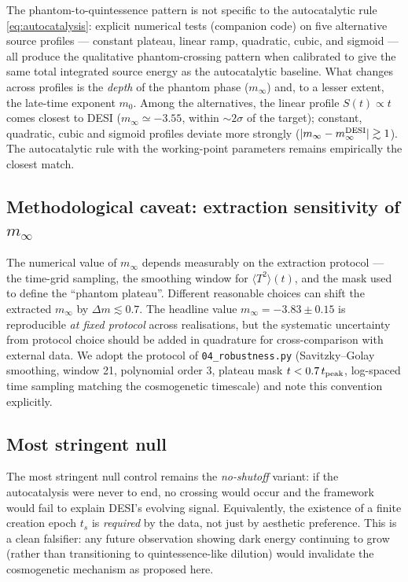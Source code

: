 \documentclass[11pt,a4paper]{article}
\begin{document}
The phantom-to-quintessence pattern is not specific to the
autocatalytic rule \eqref{eq:autocatalysis}: explicit numerical tests
(companion code) on five alternative source profiles --- constant
plateau, linear ramp, quadratic, cubic, and sigmoid --- all produce
the qualitative phantom-crossing pattern when calibrated to give the
same total integrated source energy as the autocatalytic baseline.
What changes across profiles is the \emph{depth} of the phantom phase
($m_\infty$) and, to a lesser extent, the late-time exponent $m_0$.
Among the alternatives, the linear profile $S(t) \propto t$ comes
closest to DESI ($m_\infty \simeq -3.55$, within $\sim 2\sigma$ of
the target); constant, quadratic, cubic and sigmoid profiles deviate
more strongly ($|m_\infty - m_\infty^{\rm DESI}| \gtrsim 1$). The
autocatalytic rule with the working-point parameters remains
empirically the closest match.

\subsection{Methodological caveat: extraction sensitivity of $m_\infty$}
\label{sec:extraction-sensitivity}

The numerical value of $m_\infty$ depends measurably on the
extraction protocol --- the time-grid sampling, the smoothing window
for $\langle T^2 \rangle(t)$, and the mask used to define the
``phantom plateau''. Different reasonable choices can shift the
extracted $m_\infty$ by $\Delta m \lesssim 0.7$. The headline value
$m_\infty = -3.83 \pm 0.15$ is reproducible \emph{at fixed protocol}
across realisations, but the systematic uncertainty from protocol
choice should be added in quadrature for cross-comparison with
external data. We adopt the protocol of \texttt{04\_robustness.py}
(Savitzky--Golay smoothing, window 21, polynomial order 3, plateau
mask $t < 0.7\,t_{\rm peak}$, log-spaced time sampling matching the
cosmogenetic timescale) and note this convention explicitly.

\subsection{Most stringent null}

The most stringent null control remains the \emph{no-shutoff} variant:
if the autocatalysis were never to end, no crossing would occur and
the framework would fail to explain DESI's evolving signal.
Equivalently, the existence of a finite creation epoch $t_s$ is
\emph{required} by the data, not just by aesthetic preference. This
is a clean falsifier: any future observation showing dark energy
continuing to grow (rather than transitioning to quintessence-like
dilution) would invalidate the cosmogenetic mechanism as proposed
here.
\end{document}
